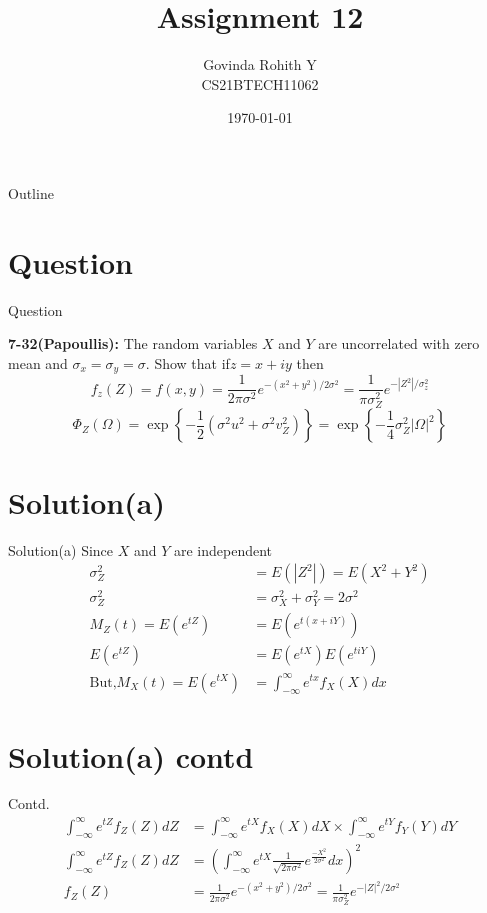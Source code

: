 \documentclass{beamer}
\title{Assignment 12}
\author{Govinda Rohith Y\\CS21BTECH11062}
\date{\today}
\providecommand{\abs}[1]{\left\vert#1\right\vert}
\begin{document}
\begin{frame}
    \titlepage 
\end{frame}

\logo{}


\begin{frame}{Outline}
    \tableofcontents
\end{frame}


\section{Question}
\begin{frame}{Question}

\begin{block}{\textbf{7-32(Papoullis):}}
         The random variables $X$ and $Y$ are uncorrelated with zero mean and $\sigma_x=\sigma_y=\sigma$. Show that
if$z=x+iy$ then
$$f_z(Z)=f(x,y)=\frac{1}{2\pi\sigma^2}e^{-(x^2+y^2)/2\sigma^2}=\frac{1}{\pi\sigma_Z^2}e^{-\abs{Z^2}/\sigma_z^2}$$
$$\Phi_Z{(\Omega)}=\exp{\left\{-\frac{1}{2}(\sigma^2u^2+\sigma^2v^2_Z)\right\}}=\exp{\left\{-\frac{1}{4}\sigma_Z^2\abs{\Omega}^2\right\}}$$
    \end{block}
\section{Solution(a)}
\end{frame}
\begin{frame}{Solution(a)}
    Since $X$ and $Y$ are independent
    \begin{align}
        \sigma_Z^2&=E(\abs{Z^2})=E(X^2+Y^2)\\
      \sigma_Z^2&=\sigma_X^2+\sigma_Y^2=2\sigma^2\\
      M_Z(t)=E(e^{tZ})&=E(e^{t(x+iY)})\\
      E(e^{tZ})&=E(e^{tX})E(e^{tiY})\\
      \text{But,}M_X(t)=E(e^{tX})&=\int _{-\infty}^\infty e^{tx}f_X(X)dx
    \end{align}
\end{frame}
\section{Solution(a) contd}
\begin{frame}{Contd.}
    \begin{align}
        \int_{-\infty}^{\infty}e^{tZ}f_Z(Z)dZ&=\int_{-\infty}^{\infty}e^{tX}f_X(X)dX\times\int_{-\infty}^{\infty}e^{tY}f_Y(Y)dY\\
        \int_{-\infty}^{\infty}e^{tZ}f_Z(Z)dZ&=\left(\int_{-\infty}^{\infty}e^{tX}\frac{1}{\sqrt{2\pi \sigma ^2}}e^{\frac{-X^2}{2\sigma^2}}dx\right)^2\\
      f_Z(Z)&=\frac{1}{2\pi\sigma^2}e^{-(x^2+y^2)/2\sigma^2}=\frac{1}{\pi\sigma_Z^2}e^{-\abs{Z}^2/2\sigma^2}
    \end{align}
\end{frame}
\end{document}
